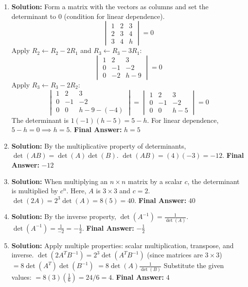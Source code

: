 \documentclass[11pt]{article}
\begin{document}
\begin{enumerate}
    \item \textbf{Solution:} Form a matrix with the vectors as columns and set the determinant to $0$ (condition for linear dependence).
    \[ \begin{vmatrix} 1 & 2 & 3 \\ 2 & 3 & 4 \\ 3 & 4 & h \end{vmatrix} = 0 \]
    Apply $R_2 \leftarrow R_2 - 2R_1$ and $R_3 \leftarrow R_3 - 3R_1$:
    \[ \begin{vmatrix} 1 & 2 & 3 \\ 0 & -1 & -2 \\ 0 & -2 & h-9 \end{vmatrix} = 0 \]
    Apply $R_3 \leftarrow R_3 - 2R_2$:
    \[ \begin{vmatrix} 1 & 2 & 3 \\ 0 & -1 & -2 \\ 0 & 0 & h-9 - (-4) \end{vmatrix} = \begin{vmatrix} 1 & 2 & 3 \\ 0 & -1 & -2 \\ 0 & 0 & h-5 \end{vmatrix} = 0 \]
    The determinant is $1(-1)(h-5) = 5-h$. For linear dependence, $5-h = 0 \implies h = 5$.
    \textbf{Final Answer:} $h = 5$

    \item \textbf{Solution:} By the multiplicative property of determinants, $\det(AB) = \det(A)\det(B)$.
    $\det(AB) = (4)(-3) = -12$.
    \textbf{Final Answer:} $-12$

    \item \textbf{Solution:} When multiplying an $n \times n$ matrix by a scalar $c$, the determinant is multiplied by $c^n$. Here, $A$ is $3 \times 3$ and $c = 2$.
    $\det(2A) = 2^3 \det(A) = 8(5) = 40$.
    \textbf{Final Answer:} $40$

    \item \textbf{Solution:} By the inverse property, $\det(A^{-1}) = \frac{1}{\det(A)}$.
    $\det(A^{-1}) = \frac{1}{-2} = -\frac{1}{2}$.
    \textbf{Final Answer:} $-\frac{1}{2}$

    \item \textbf{Solution:} Apply multiple properties: scalar multiplication, transpose, and inverse.
    $\det(2 A^T B^{-1}) = 2^3 \det(A^T B^{-1})$ (since matrices are $3 \times 3$)
    $= 8 \det(A^T) \det(B^{-1})$
    $= 8 \det(A) \frac{1}{\det(B)}$
    Substitute the given values: $= 8(3)\left(\frac{1}{6}\right) = 24 / 6 = 4$.
    \textbf{Final Answer:} $4$


\end{enumerate}
\end{document}
